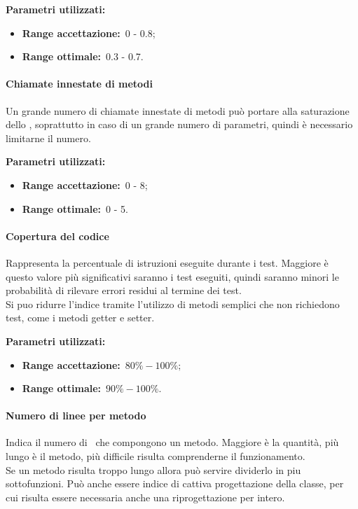 				\textbf{Parametri utilizzati:}
				\begin{itemize}
					\item \textbf{Range accettazione:}\ 0 - 0.8;
					\item \textbf{Range ottimale:}\ 0.3 - 0.7.
				\end{itemize}
			\paragraph{Chiamate innestate di metodi}
			\label{sec:3.7.3.6}
				Un grande numero di chiamate innestate di metodi può portare alla saturazione dello , soprattutto in caso di un grande numero di parametri, quindi è necessario limitarne il numero.
				
				\textbf{Parametri utilizzati:}
				\begin{itemize}
					\item \textbf{Range accettazione:}\ 0 - 8;
					\item \textbf{Range ottimale:}\ 0 - 5.
				\end{itemize}
			\paragraph{Copertura del codice}
			\label{sec:3.7.3.7}
				Rappresenta la percentuale di istruzioni eseguite durante i test. Maggiore è questo valore più significativi saranno i test eseguiti, quindi saranno minori le probabilità di rilevare errori residui al termine dei test. \\
				Si puo ridurre l'indice tramite l'utilizzo di metodi semplici che non richiedono test, come i metodi getter e setter.
				
				\textbf{Parametri utilizzati:}
				\begin{itemize}
					\item \textbf{Range accettazione:}\ $80\% - 100\%;$
					\item \textbf{Range ottimale:}\ $90\% - 100\%.$
				\end{itemize}
			\paragraph{Numero di linee per metodo}
			\label{sec:3.7.3.8}
				Indica il numero di \ che compongono un metodo. Maggiore è la quantità, più lungo è il metodo, più difficile risulta comprenderne il funzionamento. \\
				Se un metodo risulta troppo lungo allora può servire dividerlo in piu sottofunzioni. Può anche essere indice di cattiva progettazione della classe, per cui risulta essere necessaria anche una riprogettazione per intero.
				
